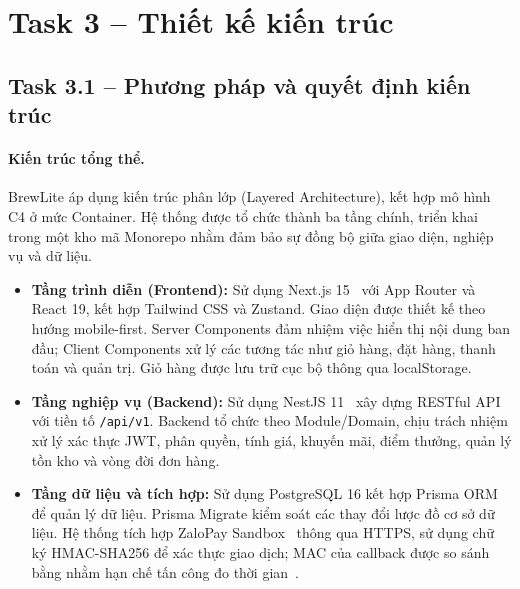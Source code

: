 

\section{Task 3 -- Thiết kế kiến trúc}

\subsection{Task 3.1 -- Phương pháp và quyết định kiến trúc}

\paragraph{Kiến trúc tổng thể.}

BrewLite áp dụng kiến trúc phân lớp (Layered Architecture), kết hợp mô hình C4 ở mức Container. Hệ thống được tổ chức thành ba tầng chính, triển khai trong một kho mã Monorepo nhằm đảm bảo sự đồng bộ giữa giao diện, nghiệp vụ và dữ liệu.

\begin{itemize}
    \item \textbf{Tầng trình diễn (Frontend):} Sử dụng Next.js 15~\cite{nextjs} với App Router và React 19, kết hợp Tailwind CSS và Zustand. Giao diện được thiết kế theo hướng mobile-first. Server Components đảm nhiệm việc hiển thị nội dung ban đầu; Client Components xử lý các tương tác như giỏ hàng, đặt hàng, thanh toán và quản trị. Giỏ hàng được lưu trữ cục bộ thông qua localStorage.

    \item \textbf{Tầng nghiệp vụ (Backend):} Sử dụng NestJS 11~\cite{nestjs} xây dựng RESTful API với tiền tố \texttt{/api/v1}. Backend tổ chức theo Module/Domain, chịu trách nhiệm xử lý xác thực JWT, phân quyền, tính giá, khuyến mãi, điểm thưởng, quản lý tồn kho và vòng đời đơn hàng.

    \item \textbf{Tầng dữ liệu và tích hợp:} Sử dụng PostgreSQL 16 kết hợp Prisma ORM~\cite{prisma} để quản lý dữ liệu. Prisma Migrate kiểm soát các thay đổi lược đồ cơ sở dữ liệu. Hệ thống tích hợp ZaloPay Sandbox~\cite{zalopay} thông qua HTTPS, sử dụng chữ ký HMAC-SHA256 để xác thực giao dịch; MAC của callback được so sánh bằng  nhằm hạn chế tấn công đo thời gian~\cite{owasp}.
\end{itemize}

